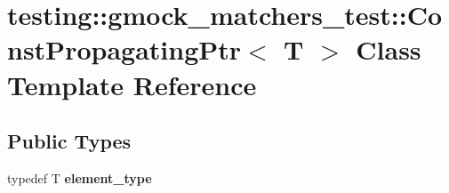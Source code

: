 \hypertarget{classtesting_1_1gmock__matchers__test_1_1_const_propagating_ptr}{}\section{testing\+:\+:gmock\+\_\+matchers\+\_\+test\+:\+:Const\+Propagating\+Ptr$<$ T $>$ Class Template Reference}
\label{classtesting_1_1gmock__matchers__test_1_1_const_propagating_ptr}
\subsection*{Public Types}
\begin{DoxyCompactItemize}
\item 
\mbox{\label{classtesting_1_1gmock__matchers__test_1_1_const_propagating_ptr_a2ad1f3127185fadd33eed42627ed5644}} 
typedef T {\bfseries element\+\_\+type}
\end{DoxyCompactItemize}

